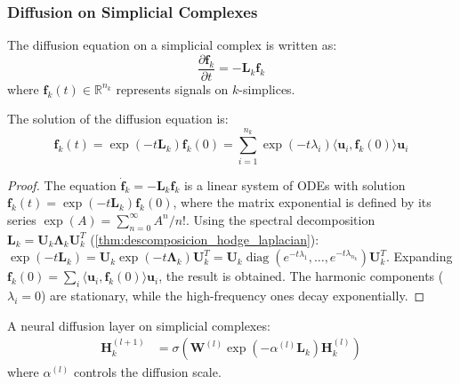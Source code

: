 \subsubsection{Diffusion on Simplicial Complexes}

\begin{definition}\label{def:ecuacion_difusion_simplicial}
The diffusion equation on a simplicial complex is written as:
\begin{equation}
    \frac{\partial \mathbf{f}_k}{\partial t} = -\mathbf{L}_k \mathbf{f}_k
\end{equation}
where $\mathbf{f}_k(t) \in \mathbb{R}^{n_k}$ represents signals on $k$-simplices.
\end{definition}

\begin{theorem}\label{thm:solucion_difusion_simplicial}
The solution of the diffusion equation is:
\begin{equation}
    \mathbf{f}_k(t) = \exp(-t\mathbf{L}_k) \mathbf{f}_k(0) = \sum_{i=1}^{n_k} \exp(-t\lambda_i) \langle \mathbf{u}_i, \mathbf{f}_k(0) \rangle \mathbf{u}_i
\end{equation}
\end{theorem}

\begin{proof}
The equation $\dot{\mathbf{f}}_k = -\mathbf{L}_k \mathbf{f}_k$ is a linear system of ODEs with solution $\mathbf{f}_k(t) = \exp(-t\mathbf{L}_k) \mathbf{f}_k(0)$, where the matrix exponential is defined by its series $\exp(A) = \sum_{n=0}^\infty A^n/n!$. Using the spectral decomposition $\mathbf{L}_k = \mathbf{U}_k \boldsymbol{\Lambda}_k \mathbf{U}_k^T$ (\autoref{thm:descomposicion_hodge_laplacian}): $\exp(-t\mathbf{L}_k) = \mathbf{U}_k \exp(-t\boldsymbol{\Lambda}_k) \mathbf{U}_k^T = \mathbf{U}_k \operatorname{diag}(e^{-t\lambda_1}, \ldots, e^{-t\lambda_{n_k}}) \mathbf{U}_k^T$. Expanding $\mathbf{f}_k(0) = \sum_i \langle \mathbf{u}_i, \mathbf{f}_k(0)\rangle \mathbf{u}_i$, the result is obtained. The harmonic components ($\lambda_i = 0$) are stationary, while the high-frequency ones decay exponentially.
\end{proof}

\begin{definition}\label{def:neural_diffusion_complejos}
A neural diffusion layer on simplicial complexes:
\begin{align}
    \mathbf{H}_k^{(l+1)} &= \sigma\left(\mathbf{W}^{(l)} \exp(-\alpha^{(l)} \mathbf{L}_k) \mathbf{H}_k^{(l)}\right)
\end{align}
where $\alpha^{(l)}$ controls the diffusion scale.
\end{definition}

